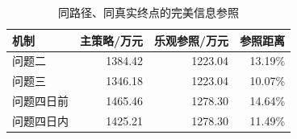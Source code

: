 \begin{table}[H]\centering\small
\caption{同路径、同真实终点的完美信息参照}
\begin{tabular}{lrrr}
\toprule
机制 & 主策略/万元 & 乐观参照/万元 & 参照距离 \\
\midrule
问题二 & 1384.42 & 1223.04 & 13.19\% \\
问题三 & 1346.18 & 1223.04 & 10.07\% \\
问题四日前 & 1465.46 & 1278.30 & 14.64\% \\
问题四日内 & 1425.21 & 1278.30 & 11.49\% \\
\bottomrule\end{tabular}\end{table}
